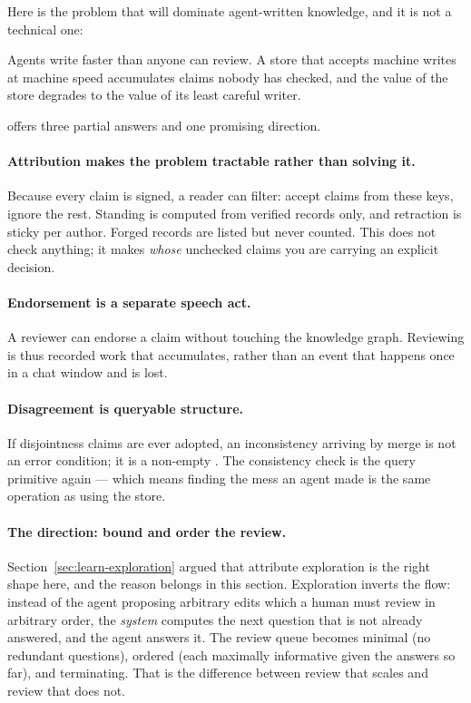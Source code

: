 Here is the problem that will dominate agent-written knowledge, and it is not
a technical one:

\begin{keyidea}
Agents write faster than anyone can review. A store that accepts machine
writes at machine speed accumulates claims nobody has checked, and the value
of the store degrades to the value of its least careful writer.
\end{keyidea}

\odag{} offers three partial answers and one promising direction.

\paragraph{Attribution makes the problem tractable rather than solving it.}
Because every claim is signed, a reader can filter: accept claims from these
keys, ignore the rest. Standing is computed from verified records only, and
retraction is sticky per author. Forged records are listed but never counted.
This does not check anything; it makes \emph{whose} unchecked claims you are
carrying an explicit decision.

\paragraph{Endorsement is a separate speech act.} A reviewer can endorse a
claim without touching the knowledge graph. Reviewing is thus recorded work
that accumulates, rather than an event that happens once in a chat window and
is lost.

\paragraph{Disagreement is queryable structure.} If disjointness claims are
ever adopted, an inconsistency arriving by merge is not an error condition; it
is a non-empty . The consistency check is the query
primitive again --- which means finding the mess an agent made is the same
operation as using the store.

\paragraph{The direction: bound and order the review.}
Section~\ref{sec:learn-exploration} argued that attribute exploration is the
right shape here, and the reason belongs in this section. Exploration inverts
the flow: instead of the agent proposing arbitrary edits which a human must
review in arbitrary order, the \emph{system} computes the next question that
is not already answered, and the agent answers it. The review queue becomes
minimal (no redundant questions), ordered (each maximally informative given
the answers so far), and terminating. That is the difference between review
that scales and review that does not.

